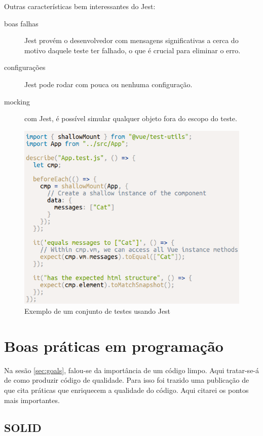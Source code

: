 Outras características bem interessantes do Jest:
\begin{description}
    \item[boas falhas] Jest provém o desenvolvedor com mensagens significativas a cerca do motivo daquele teste
    ter falhado, o que é crucial para eliminar o erro.
    \item[configurações] Jest pode rodar com pouca ou nenhuma configuração.
    \item[mocking] com Jest, é possível simular qualquer objeto fora do escopo do teste.
\end{description}

\begin{figure}[htb]
    \centering
    \includegraphics[width=.55\textwidth]{figuras/jest.png}
    \caption{Exemplo de um conjunto de testes usando Jest}
    \label{fig:jest}
\end{figure}

\section{Boas práticas em programação}
\label{sec:boas-praticas}

Na sesão \ref{sec:goals}, falou-se da importância de um código limpo. Aqui tratar-se-á de como produzir código
de qualidade. Para isso foi trazido uma publicação de \cite{BP} que cita práticas que enriquecem a qualidade do
código. Aqui citarei os pontos mais importantes.

\subsection{SOLID}\label{subsec:solid}

